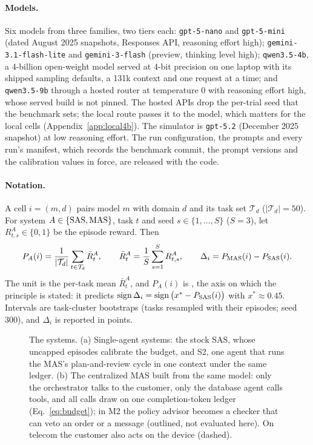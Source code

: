 \paragraph{Models.} Six models from three families, two tiers each: \texttt{gpt-5-nano} and \texttt{gpt-5-mini} (dated August 2025 snapshots, Responses API, reasoning effort high); \texttt{gemini-3.1-flash-lite} and \texttt{gemini-3-flash} (preview, thinking level high); \texttt{qwen3.5-4b}, a 4-billion open-weight model served at 4-bit precision on one laptop with its shipped sampling defaults, a 131k context and one request at a time; and \texttt{qwen3.5-9b} through a hosted router at temperature 0 with reasoning effort high, whose served build is not pinned. The hosted APIs drop the per-trial seed that the benchmark sets; the local route passes it to the model, which matters for the local cells (Appendix~\ref{app:local4b}). The simulator is \texttt{gpt-5.2} (December 2025 snapshot) at low reasoning effort. The run configuration, the prompts and every run's manifest, which records the benchmark commit, the prompt versions and the calibration values in force, are released with the code.

\paragraph{Notation.} A cell $i=(m,d)$ pairs model $m$ with domain $d$ and its task set $\mathcal{T}_d$ ($|\mathcal{T}_d|=50$). For system $A\in\{\text{\textup{SAS}},\text{\textup{MAS}}\}$, task $t$ and seed $s\in\{1,\dots,S\}$ ($S=3$), let $R^{A}_{t,s}\in\{0,1\}$ be the episode reward. Then
\begin{equation}
\label{eq:gain}
P_A(i)=\frac{1}{|\mathcal{T}_d|}\sum_{t\in\mathcal{T}_d}\bar R^{A}_{t},\qquad \bar R^{A}_{t}=\frac{1}{S}\sum_{s=1}^{S}R^{A}_{t,s},\qquad \Delta_i=P_{\text{\textup{MAS}}}(i)-P_{\text{\textup{SAS}}}(i).
\end{equation}
The unit is the per-task mean $\bar R^{A}_{t}$, and $P_A(i)$ is \passone, the axis on which the principle is stated: it predicts $\operatorname{sign}\Delta_i=\operatorname{sign}\big(x^{\ast}-P_{\text{\textup{SAS}}}(i)\big)$ with $x^{\ast}\approx 0.45$. Intervals are task-cluster bootstraps (tasks resampled with their episodes; seed 300), and $\Delta_i$ is reported in points.

\begin{figure}[t]
\begin{center}
\resizebox{\linewidth}{!}{}
\end{center}
\caption{The systems. (a) Single-agent systems: the stock SAS, whose uncapped episodes calibrate the budget, and S2, one agent that runs the MAS's plan-and-review cycle in one context under the same ledger. (b) The centralized MAS built from the same model: only the orchestrator talks to the customer, only the database agent calls tools, and all calls draw on one completion-token ledger (Eq.~\ref{eq:budget}); in M2 the policy advisor becomes a checker that can veto an order or a message (outlined, not evaluated here). On telecom the customer also acts on the device (dashed).}
\label{fig:design}
\end{figure}

